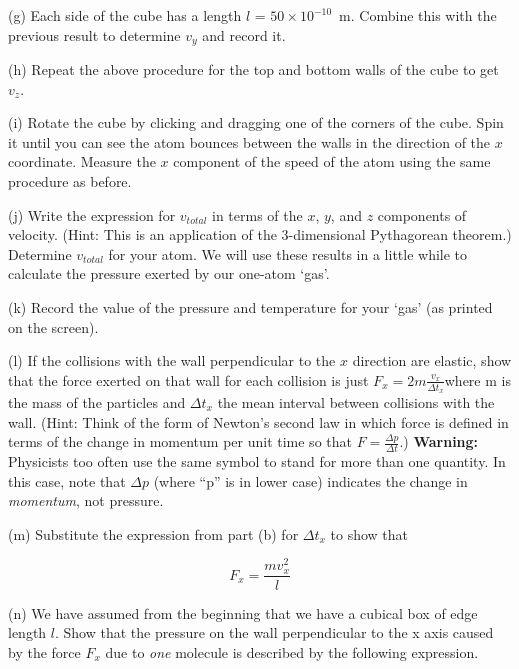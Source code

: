(g) Each side of the cube has a length $l$ = $50 \times 10^{-10}$~m.
Combine this with the previous result to determine $v_y$ and record it.
\vspace{20mm}

(h) Repeat the above procedure for the top and bottom walls of the cube to get $v_z$.
\vspace{20mm}

(i) Rotate the cube by clicking and dragging one of the corners of the cube.
Spin it until you can see the atom bounces between the walls in the direction of
the $x$ coordinate.
Measure the $x$ component of the speed of the atom using the same procedure as before.
\vspace{20mm}

(j) Write the
expression for \( v_{total} \) in terms of the $x$, $y$, and $z$ components
of velocity. (Hint: This is an application of the 3-dimensional Pythagorean
theorem.) Determine $v_{total}$ for your atom.
We will use these results in a little while to calculate the pressure exerted by
our one-atom `gas'.
\vspace{20mm}

(k) Record the value of the pressure and temperature for your `gas' (as printed on the screen).
\vspace{20mm}

(l) If the collisions with the wall perpendicular to the $x$ direction
are elastic, show that the force exerted on that wall for each collision
is just \( F_{x}=2m\frac{v_{x}}{\Delta t_{x}} \)where m is the mass
of the particles and \( \Delta t_{x} \) the mean interval between
collisions with the wall. (Hint: Think of the form of Newton's second
law in which force is defined in terms of the change in momentum per
unit time so that \( F=\frac{\Delta p}{\Delta t} \).) \textbf{Warning:} Physicists too often use the same symbol to stand
for more than one quantity. In this case, note that \( \Delta p \)
(where {}``p'' is in lower case) indicates the change in \emph{momentum},
not pressure.
\vspace{20mm}

(m) Substitute the expression from part (b) for \( \Delta t_{x} \)
to show that 

\[
F_{x}=\frac{mv_{x}^{2}}{l}\]

\vspace{20mm}

(n) We have assumed from the beginning that we have a cubical box of edge length $l$. Show that the pressure on the wall perpendicular to the x axis caused by
the force \( F_{x} \) due to \emph{one} molecule is described by
the following expression.

